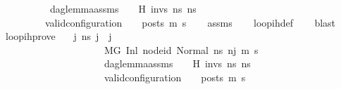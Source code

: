 \begin{isabellebody}
\ \ \ \ \ \ \ \ \ \ {\isachardoublequoteopen}dag{\isacharunderscore}{\kern0pt}lemma{\isacharunderscore}{\kern0pt}assms\ {\isasymLambda}\ {\isasymGamma}\ {\isasymOmega}\ H\ invs\ ns{}{\isacharprime}{\kern0pt}{\isacharprime}{\kern0pt}\ ns{}{\isachardoublequoteclose}\isanewline
\ \ \ \ \ \ \ \ \ {\isachardoublequoteopen}valid{\isacharunderscore}{\kern0pt}configuration\ {\isasymLambda}\ {\isasymGamma}\ {\isasymOmega}\ posts\ m{\isacharprime}{\kern0pt}\ s{\isacharprime}{\kern0pt}{\isachardoublequoteclose}\isanewline
%
\isadelimproof
\ \ %
\endisadelimproof
%
\isatagproof
{}\isamarkupfalse%
\ assms\isanewline
\ \ \isamarkupfalse%
\ loop{\isacharunderscore}{\kern0pt}ih{\isacharunderscore}{\kern0pt}def\isanewline
\ \ \isamarkupfalse%
\ blast%
\endisatagproof
{\isafoldproof}%
%
\isadelimproof
\isanewline
%
\endisadelimproof
\isanewline
{}\isamarkupfalse%
\ loop{\isacharunderscore}{\kern0pt}ih{\isacharunderscore}{\kern0pt}prove{\isacharcolon}{\kern0pt}\isanewline
\ \ \ {\isachardoublequoteopen}{\isasymAnd}j{\isacharprime}{\kern0pt}\ ns{}{\isacharprime}{\kern0pt}{\isacharprime}{\kern0pt}{\isachardot}{\kern0pt}\ j{\isacharprime}{\kern0pt}\ {\isasymle}\ j\ {\isasymLongrightarrow}\isanewline
\ \ \ \ \ \ \ \ \ \ \ \ \ \ \ \ \ \ \ \ \ {\isacharparenleft}{\kern0pt}M{\isacharcomma}{\kern0pt}{\isasymLambda}{\isacharcomma}{\kern0pt}{\isasymGamma}{\isacharcomma}{\kern0pt}{\isasymOmega}{\isacharcomma}{\kern0pt}G\ {\isasymturnstile}{\isacharparenleft}{\kern0pt}Inl\ node{\isacharunderscore}{\kern0pt}id{\isacharcomma}{\kern0pt}\ Normal\ ns{}{\isacharprime}{\kern0pt}{\isacharprime}{\kern0pt}{\isacharparenright}{\kern0pt}\ {\isacharminus}{\kern0pt}n{\isasymrightarrow}{\isacharcircum}{\kern0pt}j{\isacharprime}{\kern0pt}\ {\isacharparenleft}{\kern0pt}m{\isacharprime}{\kern0pt}{\isacharcomma}{\kern0pt}\ s{\isacharprime}{\kern0pt}{\isacharparenright}{\kern0pt}{\isacharparenright}{\kern0pt}\ {\isasymLongrightarrow}\isanewline
\ \ \ \ \ \ \ \ \ \ \ \ \ \ \ \ \ \ \ \ \ dag{\isacharunderscore}{\kern0pt}lemma{\isacharunderscore}{\kern0pt}assms\ {\isasymLambda}\ {\isasymGamma}\ {\isasymOmega}\ H\ invs\ ns{}{\isacharprime}{\kern0pt}{\isacharprime}{\kern0pt}\ ns{}\ {\isasymLongrightarrow}\isanewline
\ \ \ \ \ \ \ \ \ \ \ \ \ \ \ \ \ \ \ \ \ valid{\isacharunderscore}{\kern0pt}configuration\ {\isasymLambda}\ {\isasymGamma}\ {\isasymOmega}\ posts\ m{\isacharprime}{\kern0pt}\ s{\isacharprime}{\kern0pt}{\isachardoublequoteclose}\isanewline

\end{isabellebody}
